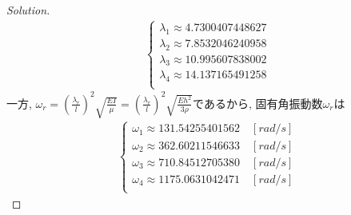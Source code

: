 \documentclass[12pt]{jsarticle}
\newenvironment{solution}
  {\renewcommand\qedsymbol{$\blacksquare$}\begin{proof}[Solution]}
  {\end{proof}}
\begin{document}
\begin{solution}
\begin{eqnarray*}
\left\{
\begin{array}{l} 
\lambda_1 \approx 4.7300407448627 \\
\lambda_2 \approx 7.8532046240958 \\
\lambda_3 \approx 10.995607838002\\
\lambda_4 \approx 14.137165491258 \\
\end{array}
\right.
\end{eqnarray*}
一方, $\omega_r = (\frac{\lambda_r}{l})^2\sqrt{\frac{EI}{\mu}} = (\frac{\lambda_r}{l})^2\sqrt{\frac{Eh^2}{3\rho}}$であるから, 固有角振動数$\omega_r$は
\begin{eqnarray*}
\left\{
\begin{array}{l} 
\omega_1 \approx 131.54255401562 \quad [rad/s] \\
\omega_2 \approx 362.60211546633 \quad [rad/s] \\
\omega_3 \approx 710.84512705380 \quad [rad/s] \\
\omega_4 \approx 1175.0631042471 \quad [rad/s] \\
\end{array}
\right.
\end{eqnarray*}

\end{solution}
\end{document}
